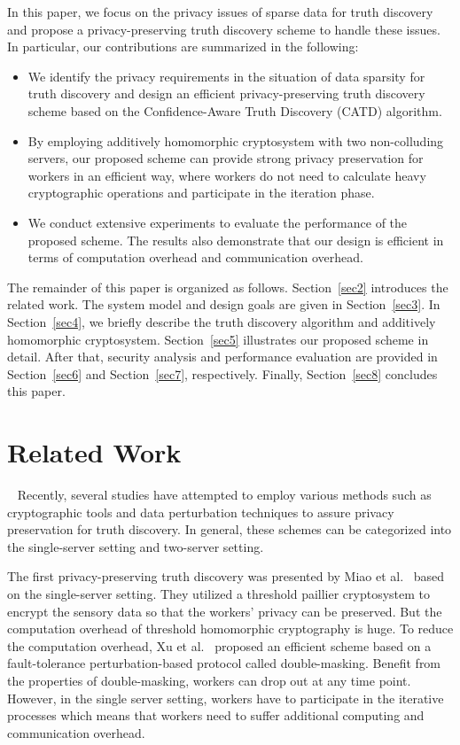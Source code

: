 \documentclass[conference]{IEEEtran}
\begin{document}
In this paper, we focus on the privacy issues of sparse data for truth discovery and propose a privacy-preserving truth discovery scheme to handle these issues.
In particular, our contributions are summarized in the following:
\begin{itemize}
  \item We identify the privacy requirements in the situation of data sparsity for truth discovery and design an efficient privacy-preserving truth discovery scheme based on the Confidence-Aware Truth Discovery (CATD) algorithm.
  \item By employing additively homomorphic cryptosystem with two non-colluding
servers, our proposed scheme can provide strong privacy preservation for workers in an efficient way, where workers do not need to calculate heavy cryptographic operations and participate in the iteration phase.
  \item We conduct extensive experiments to evaluate the performance of the proposed scheme. The results also demonstrate that our design is efficient in terms of computation overhead and communication overhead.
\end{itemize}

The remainder of this paper is organized as follows.
Section~\ref{sec2} introduces the related work.
The system model and design goals are given in Section~\ref{sec3}.
In Section~\ref{sec4}, we briefly describe the truth discovery algorithm and additively homomorphic cryptosystem.
Section~\ref{sec5} illustrates our proposed scheme in detail.
After that, security analysis and performance evaluation are provided in Section~\ref{sec6} and Section~\ref{sec7}, respectively.
Finally, Section~\ref{sec8} concludes this paper.

\section{Related Work}~\label{sec2}
Recently, several studies have attempted to employ various methods such as cryptographic tools and data perturbation techniques to assure privacy preservation for truth discovery.
In general, these schemes can be categorized into the single-server setting and two-server setting.

The first privacy-preserving truth discovery was presented by Miao et al.~\cite{miao_cloud-enabled_2015} based on the single-server setting.
They utilized a threshold paillier cryptosystem to encrypt the sensory data so that the workers' privacy can be preserved.
But the computation overhead of threshold homomorphic cryptography is huge.
To reduce the computation overhead, Xu et al.~\cite{xu_efficient_2019} proposed an efficient scheme based on a fault-tolerance perturbation-based protocol called double-masking.
Benefit from the properties of double-masking, workers can drop out at any time point.
However, in the single server setting, workers have to participate in the iterative processes which means that workers need to suffer additional computing and communication overhead.
\end{document}

